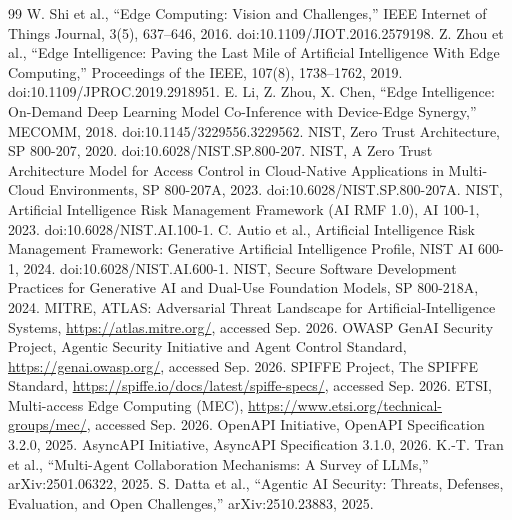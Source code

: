 \documentclass[11pt]{article}
\begin{document}
\begin{thebibliography}{99}
 W. Shi et al., ``Edge Computing: Vision and Challenges,'' IEEE Internet of Things Journal, 3(5), 637--646, 2016. doi:10.1109/JIOT.2016.2579198.
 Z. Zhou et al., ``Edge Intelligence: Paving the Last Mile of Artificial Intelligence With Edge Computing,'' Proceedings of the IEEE, 107(8), 1738--1762, 2019. doi:10.1109/JPROC.2019.2918951.
 E. Li, Z. Zhou, X. Chen, ``Edge Intelligence: On-Demand Deep Learning Model Co-Inference with Device-Edge Synergy,'' MECOMM, 2018. doi:10.1145/3229556.3229562.
 NIST, Zero Trust Architecture, SP 800-207, 2020. doi:10.6028/NIST.SP.800-207.
 NIST, A Zero Trust Architecture Model for Access Control in Cloud-Native Applications in Multi-Cloud Environments, SP 800-207A, 2023. doi:10.6028/NIST.SP.800-207A.
 NIST, Artificial Intelligence Risk Management Framework (AI RMF 1.0), AI 100-1, 2023. doi:10.6028/NIST.AI.100-1.
 C. Autio et al., Artificial Intelligence Risk Management Framework: Generative Artificial Intelligence Profile, NIST AI 600-1, 2024. doi:10.6028/NIST.AI.600-1.
 NIST, Secure Software Development Practices for Generative AI and Dual-Use Foundation Models, SP 800-218A, 2024.
 MITRE, ATLAS: Adversarial Threat Landscape for Artificial-Intelligence Systems, \url{https://atlas.mitre.org/}, accessed Sep. 2026.
 OWASP GenAI Security Project, Agentic Security Initiative and Agent Control Standard, \url{https://genai.owasp.org/}, accessed Sep. 2026.
 SPIFFE Project, The SPIFFE Standard, \url{https://spiffe.io/docs/latest/spiffe-specs/}, accessed Sep. 2026.
 ETSI, Multi-access Edge Computing (MEC), \url{https://www.etsi.org/technical-groups/mec/}, accessed Sep. 2026.
 OpenAPI Initiative, OpenAPI Specification 3.2.0, 2025.
 AsyncAPI Initiative, AsyncAPI Specification 3.1.0, 2026.
 K.-T. Tran et al., ``Multi-Agent Collaboration Mechanisms: A Survey of LLMs,'' arXiv:2501.06322, 2025.
 S. Datta et al., ``Agentic AI Security: Threats, Defenses, Evaluation, and Open Challenges,'' arXiv:2510.23883, 2025.
\end{thebibliography}
\end{document}
